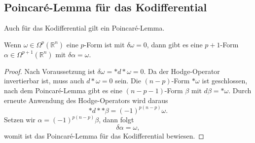 %
%
\subsection{Poincaré-Lemma für das Kodifferential}
Auch für das Kodifferential gilt ein Poincaré-Lemma.

\begin{satz}
Wenn $\omega \in \Omega^p(\mathbb{R}^n)$ eine $p$-Form ist mit
$\delta\omega=0$, dann gibt es eine $p+1$-Form
$\alpha\in\Omega^{p+1}(\mathbb{R}^n)$ mit $\delta\alpha=\omega$.
\end{satz}

\begin{proof}
Nach Voraussetzung ist $\delta \omega = {\ast}d{\ast}\omega = 0$.
Da der Hodge-Operator invertierbar ist, muss auch $d{\ast}\omega=0$
sein.
Die $(n-p)$-Form $\ast\omega$ ist geschlossen, nach dem Poincaré-Lemma
gibt es eine $(n-p-1)$-Form $\beta$ mit $d\beta=\ast\omega$.
Durch erneute Anwendung des Hodge-Operators wird daraus
\[
{\ast}d{\ast} {\ast}\beta = (-1)^{p(n-p)}\omega.
\]
Setzen wir $\alpha=(-1)^{p(n-p)}\beta$, dann folgt
\[
\delta \alpha = \omega,
\]
womit ist das Poincaré-Lemma für das Kodifferential bewiesen.
\end{proof}

